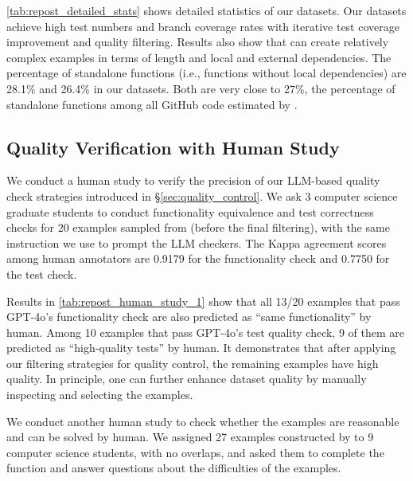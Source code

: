 \autoref{tab:repost_detailed_stats} shows detailed statistics of our datasets.
Our datasets achieve high test numbers and branch coverage rates with iterative test coverage improvement and quality filtering.
Results also show that \repostmethodName can create relatively complex examples in terms of length and local and external dependencies.
The percentage of standalone functions (i.e., functions without local dependencies) are 28.1\% and 26.4\% in our datasets. Both are very close to 27\%, the percentage of standalone functions among all GitHub code estimated by \citet{deveval}.





\subsection{Quality Verification with Human Study}
\label{sec:human_study}

We conduct a human study to verify the precision of our LLM-based quality check strategies introduced in \S\ref{sec:quality_control}.
We ask 3 computer science graduate students to conduct functionality equivalence and test correctness checks for
20 examples sampled from \repostevalsetName (before the final filtering), with the same instruction we use to prompt the LLM checkers.
The Kappa agreement scores among human annotators are 0.9179 for the functionality check and 0.7750 for the test check.

Results in \autoref{tab:repost_human_study_1} show that all 13/20 examples that pass GPT-4o's functionality check are also predicted as ``same functionality'' by human.
Among 10 examples that pass GPT-4o's test quality check, 9 of them are predicted as ``high-quality tests'' by human.
It demonstrates that after applying our filtering strategies for quality control, the remaining examples have high quality.
In principle, one can further enhance dataset quality by manually inspecting and selecting the examples.





We conduct another human study to check whether the examples are reasonable and can be solved by human.
We assigned 27 examples constructed by \repostmethodName to 9 computer science students, with no overlaps, and asked them to complete the function and answer questions about the difficulties of the examples.

